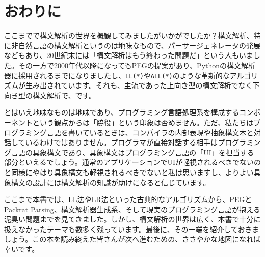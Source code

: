 \thispagestyle{empty}
\chapter*{おわりに}\label{afterword}

ここまでで構文解析の世界を概観してみましたがいかがでしたか？構文解析、特に非自然言語の構文解析というのは地味なもので、パーサージェネレータの発展などもあり、20世紀末には「構文解析はもう終わった問題だ」という人もいました。その一方で2000年代以降になってもPEGの提案があり、Pythonの構文解析器に採用されるまでになりましたし、\texttt{LL(*)}や\texttt{ALL(*)}のような革新的なアルゴリズムが生み出されています。それも、主流であった上向き型の構文解析でなく下向き型の構文解析で、です。

とはいえ地味なものは地味であり、プログラミング言語処理系を構成するコンポーネントという観点からは「脇役」という印象は否めません。ただ、私たちはプログラミング言語を書いているときは、コンパイラの内部表現や抽象構文木と対話しているわけではありません。プログラマが直接対話する相手はプログラミング言語の具象構文であり、具象構文はプログラミング言語の「UI」を担当する部分といえるでしょう。通常のアプリケーションでUIが軽視されるべきでないのと同様にやはり具象構文も軽視されるべきでないと私は思いますし、よりよい具象構文の設計には構文解析の知識が助けになると信じています。

ここまで本書では、LL法やLR法といった古典的なアルゴリズムから、PEGとPackrat Parsing、構文解析器生成系、そして現実のプログラミング言語が抱える泥臭い問題までを見てきました。しかし、構文解析の世界は広く、本書で十分に扱えなかったテーマも数多く残っています。最後に、その一端を紹介しておきましょう。この本を読み終えた皆さんが次へ進むための、ささやかな地図になれば幸いです。


